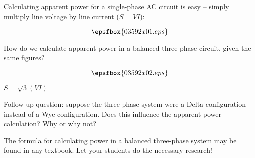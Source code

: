 

Calculating apparent power for a single-phase AC circuit is easy -- simply multiply line voltage by line current ($S = VI$):

$$\epsfbox{03592x01.eps}$$

How do we calculate apparent power in a balanced three-phase circuit, given the same figures?

$$\epsfbox{03592x02.eps}$$







$S = \sqrt{3}(VI)$

\vskip 10pt

Follow-up question: suppose the three-phase system were a Delta configuration instead of a Wye configuration.  Does this influence the apparent power calculation?  Why or why not?







The formula for calculating power in a balanced three-phase system may be found in any textbook.  Let your students do the necessary research!




